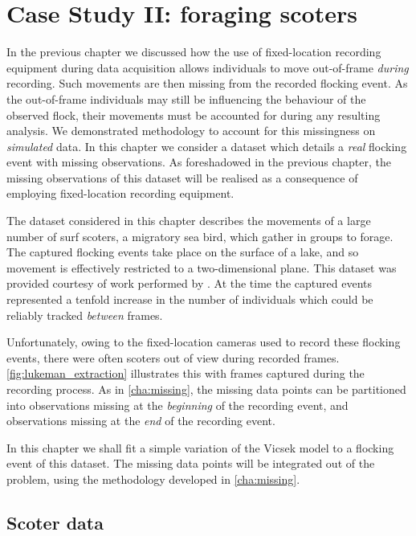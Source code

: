 \graphicspath{{fig/scoters/}}

\chapter{Case Study II: foraging scoters}
\label{cha:scoters}

In the previous chapter we discussed how the use of fixed-location recording
equipment during data acquisition allows individuals to move out-of-frame
\emph{during} recording. Such movements are then missing from the recorded
flocking event. As the out-of-frame individuals may still be influencing the
behaviour of the observed flock, their movements must be accounted for during
any resulting analysis. We demonstrated methodology to account for this
missingness on \emph{simulated} data. In this chapter we consider a dataset
which details a \emph{real} flocking event with missing observations. As
foreshadowed in the previous chapter, the missing observations of this dataset
will be realised as a consequence of employing fixed-location recording
equipment.

The dataset considered in this chapter describes the movements of a large
number of surf scoters, a migratory sea bird, which gather in groups to forage.
The captured flocking events take place on the surface of a lake, and so
movement is effectively restricted to a two-dimensional plane. This dataset was
provided courtesy of work performed by \textcite{lukeman09,lukeman10}. At the
time the captured events represented a tenfold increase in the number of
individuals which could be reliably tracked \emph{between} frames.

Unfortunately, owing to the fixed-location cameras used to record these
flocking events, there were often scoters out of view during recorded frames.
\cref{fig:lukeman_extraction} illustrates this with frames captured during the
recording process. As in \cref{cha:missing}, the missing data points can be
partitioned into observations missing at the \emph{beginning} of the recording
event, and observations missing at the \emph{end} of the recording event.

In this chapter we shall fit a simple variation of the Vicsek model to a
flocking event of this dataset. The missing data points will be integrated out
of the problem, using the methodology developed in \cref{cha:missing}.

\section{Scoter data}

